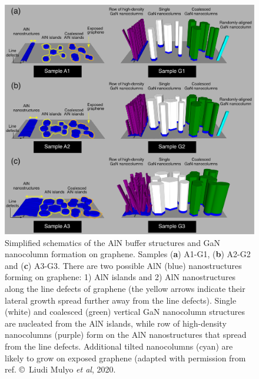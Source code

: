 \begin{figure} %
    \centering
    \includegraphics[width=\textwidth]{figures/paper-iv/fig-4.png}
    \caption[Simplified schematics of the AlN buffer structures and GaN nanocolumn formation on graphene]{Simplified schematics of the AlN buffer structures and GaN nanocolumn formation on graphene. Samples (\textbf{a}) A1-G1, (\textbf{b}) A2-G2 and (\textbf{c}) A3-G3. There are two possible AlN (blue) nanostructures forming on graphene: 1) AlN islands and 2) AlN nanostructures along the line defects of graphene (the yellow arrows indicate their lateral growth spread further away from the line defects). Single (white) and coalesced (green) vertical GaN nanocolumn structures are nucleated from the AlN islands, while row of high-density nanocolumns (purple) form on the AlN nanostructures that spread from the line defects. Additional tilted nanocolumns (cyan) are likely to grow on exposed graphene (adapted with permission from ref.  \copyright \ Liudi Mulyo \textit{et al}, 2020.}
    \label{fig:figures/paper-iv/fig-4}
\end{figure}

